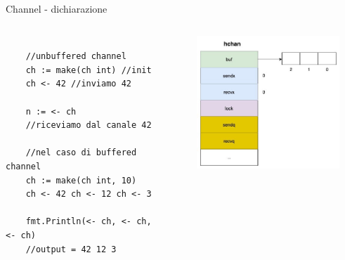\documentclass{beamer}
\begin{document}
\begin{frame}[fragile]{Channel - dichiarazione}
  \begin{columns}
    \begin{column}{0.4\textwidth}
    \begin{lstlisting}
    
    //unbuffered channel
    ch := make(ch int) //init
    ch <- 42 //inviamo 42
    
    n := <- ch 
    //riceviamo dal canale 42
    
    //nel caso di buffered channel
    ch := make(ch int, 10)
    ch <- 42 ch <- 12 ch <- 3
    
    fmt.Println(<- ch, <- ch, <- ch)
    //output = 42 12 3
    
    \end{lstlisting}
   \end{column}
   \begin{column}{0.8\textwidth}
     
    \centerline{\includegraphics[width=8cm,height=5cm,keepaspectratio]{channel-struct.jpeg}}
    
   \end{column}
  \end{columns}
\end{frame}
\end{document}
